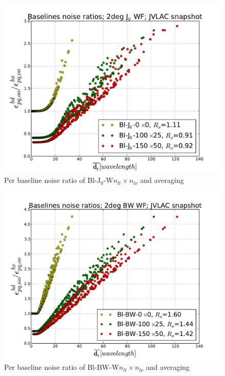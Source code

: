 \documentclass[useAMS,usenatbib]{mn2e}
\begin{document}
\begin{figure}
\begin{minipage}{0.38\linewidth}
  \end{minipage}
  \hspace{1cm}
  \begin{minipage}{0.38\linewidth}\includegraphics[width=1\textwidth]{./Figures/per-baseline-noise-ratio-bessel.pdf}\\
  \caption{Per baseline noise ratio of Bl-J$_0$-W$n_{lt}\times n_{l\nu}$ and 
averaging}\label{fig:per-baseline-noise-ratio-bessel}\end{minipage}
  \begin{minipage}{0.38\linewidth}\includegraphics[width=1\textwidth]{./Figures/per-baseline-noise-ratio-BW.pdf}
  \caption{Per baseline noise ratio of Bl-BW-W$n_{lt}\times n_{l\nu}$ and averaging}\label{fig:per-baseline-noise-ratio-BW}
  \end{minipage}
\end{figure}
\end{document}
